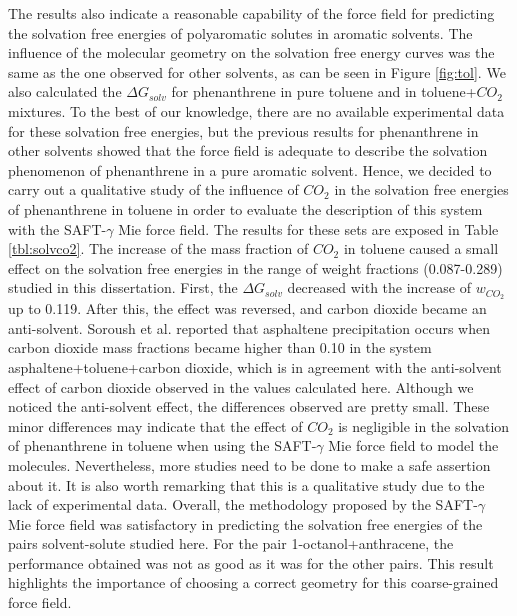 \documentclass[final,12p,times,twocolumn]{elsarticle}
\begin{document}
   The results also indicate a reasonable capability of the force field for predicting the solvation free energies of polyaromatic solutes in aromatic solvents. The influence of the molecular geometry on the solvation free energy curves was the same as the one observed for other solvents, as can be seen in Figure \ref{fig:tol}.  We also calculated the $\Delta G_{solv}$ for phenanthrene in pure toluene and in toluene+$CO_{2}$ mixtures. To the best of our knowledge, there are no available experimental data for these solvation free energies, but the previous results for phenanthrene in other solvents showed that the force field is adequate to describe the solvation phenomenon of phenanthrene in a pure aromatic solvent. Hence, we decided to carry out a qualitative study of the influence of $CO_{2}$ in the solvation free energies of phenanthrene in toluene in order to evaluate the description of this system with the SAFT-$\gamma$ Mie force field. The results for these sets are exposed in Table \ref{tbl:solvco2}. The increase of the mass fraction of $CO_{2}$ in toluene caused a small effect on the solvation free energies in the range of weight fractions (0.087-0.289) studied in this dissertation. First, the $\Delta G_{solv}$ decreased with the increase of $w_{CO_{2}}$ up to 0.119. After this, the effect was reversed, and carbon dioxide became an anti-solvent. Soroush et al. \cite{SOROUSH2014405} reported that asphaltene precipitation occurs when carbon dioxide mass fractions became higher than 0.10 in the system asphaltene+toluene+carbon dioxide, which is in agreement with the anti-solvent effect of carbon dioxide observed in the values calculated here. Although we noticed the anti-solvent effect, the differences observed are pretty small. These minor differences may indicate that the effect of $CO_{2}$ is negligible in the solvation of phenanthrene in toluene when using the SAFT-$\gamma$ Mie force field to model the molecules. Nevertheless, more studies need to be done to make a safe assertion about it. It is also worth remarking that this is a qualitative study due to the lack of experimental data. Overall, the methodology proposed by the SAFT-$\gamma$ Mie force field was satisfactory in predicting the solvation free energies of the pairs solvent-solute studied here. For the pair 1-octanol+anthracene, the performance obtained was not as good as it was for the other pairs. This result highlights the importance of choosing a correct geometry for this coarse-grained force field.    
	
\end{document}
